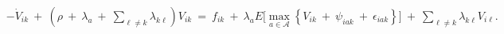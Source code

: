\begin{equation}
\begin{split}
    & -\dot{V}_{ik} \ + \ \left( \rho \ + \ \lambda_{a} \ + \ \sum_{\ell \neq k} \lambda_{k\ell} \right) V_{ik} \ = \ f_{ik} \ + \ \lambda_{a} E\Big[ \underset{a \in \mathcal{A}}{\max} \left\{ V_{ik} \ + \ \psi_{iak} \ + \ \epsilon_{iak} \right\} \Big] \ + \ \sum_{\ell \neq k} \lambda_{k\ell} V_{i\ell}.
\end{split}
\label{Equation:Firms-Problem_Value-Function}
\end{equation}